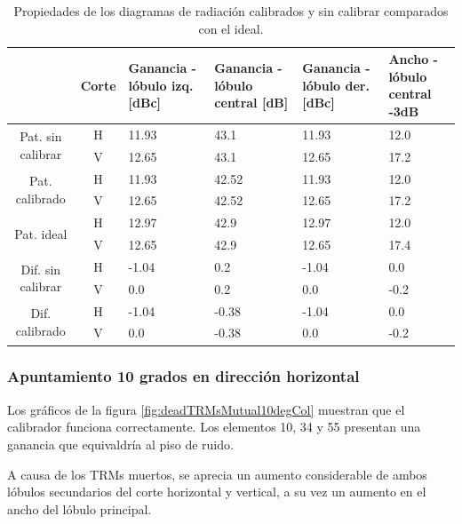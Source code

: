 \begin{table}[H]
  \footnotesize
  \centering
  \begin{tabular}{|c|c|p{2cm}|p{2.5cm}|p{2.5cm}|p{2.5cm}|}
    \cline{2-6}
    \multicolumn{1}{c|}{} & Corte & Ganancia - lóbulo izq. [dBc] & Ganancia - lóbulo central [dB] &
    Ganancia - lóbulo der. [dBc] & Ancho - lóbulo central -3dB \tabularnewline\hline
    \multirow{2}{2cm}{Pat. sin calibrar} & H & 11.93 & 43.1 & 11.93 & 12.0 \tabularnewline\cline{2-6}
     & V & 12.65 & 43.1 & 12.65 & 17.2 \tabularnewline\hline
    \multirow{2}{2cm}{Pat. calibrado} & H & 11.93 & 42.52 & 11.93 & 12.0 \tabularnewline\cline{2-6}
     & V & 12.65 & 42.52 & 12.65 & 17.2 \tabularnewline\hline
    \multirow{2}{2cm}{Pat. ideal} & H & 12.97 & 42.9 & 12.97 & 12.0 \tabularnewline\cline{2-6}
     & V & 12.65 & 42.9 & 12.65 & 17.4 \tabularnewline\hline
    \multirow{2}{2cm}{Dif. sin calibrar} & H & -1.04 & 0.2 & -1.04 & 0.0\tabularnewline\cline{2-6}
     & V & 0.0 & 0.2 & 0.0 & -0.2 \tabularnewline\hline
    \multirow{2}{2cm}{Dif. calibrado} & H & -1.04 & -0.38 & -1.04 & 0.0 \tabularnewline\cline{2-6}
     & V & 0.0 & -0.38 & 0.0 & -0.2 \tabularnewline\hline
  \end{tabular}
  \caption{Propiedades de los diagramas de radiación calibrados y sin calibrar comparados con el ideal.}
  \label{tab:deadTRMsMutual0deg}
\end{table}


\subsubsection{Apuntamiento 10 grados en dirección horizontal}

Los gráficos de la figura \ref{fig:deadTRMsMutual10degCol} muestran que el calibrador funciona correctamente. Los elementos 10, 
34 y 55 presentan una ganancia que equivaldría al piso de ruido.

A causa de los TRMs muertos, se aprecia un aumento considerable de ambos lóbulos secundarios del corte horizontal y vertical, 
a su vez un aumento en el ancho del lóbulo principal.

